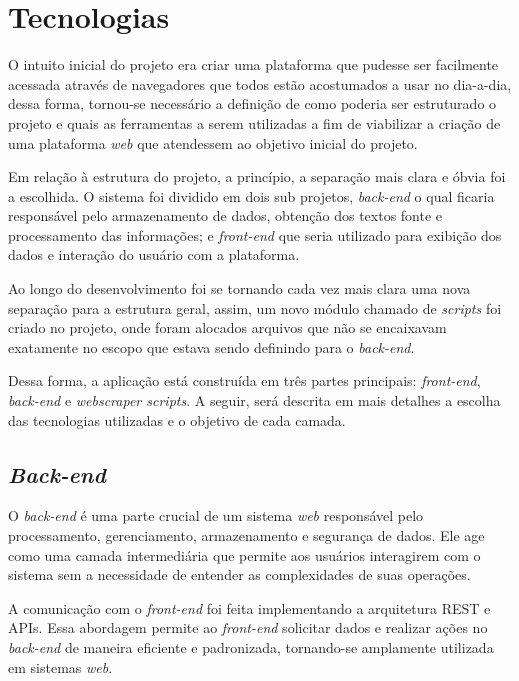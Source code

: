
\chapter{Tecnologias}

O intuito inicial do projeto era criar uma plataforma que pudesse ser
facilmente acessada através de navegadores que todos estão acostumados a usar
no dia-a-dia, dessa forma, tornou-se necessário a definição de como poderia ser
estruturado o projeto e quais as ferramentas a serem utilizadas a fim de
viabilizar a criação de uma plataforma \textit{web} que atendessem ao objetivo
inicial do projeto.

Em relação à estrutura do projeto, a princípio, a separação mais clara e óbvia
foi a escolhida. O sistema foi dividido em dois sub projetos, \textit{back-end}
o qual ficaria responsável pelo armazenamento de dados, obtenção dos textos
fonte e processamento das informações; e \textit{front-end} que seria utilizado
para exibição dos dados e interação do usuário com a plataforma.

Ao longo do desenvolvimento foi se tornando cada vez mais clara uma nova
separação para a estrutura geral, assim, um novo módulo chamado de
\textit{scripts} foi criado no projeto, onde foram alocados arquivos que não se
encaixavam exatamente no escopo que estava sendo definindo para o
\textit{back-end}.

Dessa forma, a aplicação está construída em três partes principais:
\textit{front-end}, \textit{back-end} e \textit{webscraper scripts}. A seguir,
será descrita em mais detalhes a escolha das tecnologias utilizadas e o
objetivo de cada camada.

\section{\textit{Back-end}}

O \textit{back-end} é uma parte crucial de um sistema \textit{web} responsável
pelo processamento, gerenciamento, armazenamento e segurança de dados. Ele age
como uma camada intermediária que permite aos usuários interagirem com o
sistema sem a necessidade de entender as complexidades de suas operações.

A comunicação com o \textit{front-end} foi feita implementando a arquitetura
\ac{REST} e \acp{API}. Essa abordagem permite ao \textit{front-end} solicitar
dados e realizar ações no \textit{back-end} de maneira eficiente e padronizada,
tornando-se amplamente utilizada em sistemas \textit{web}.

